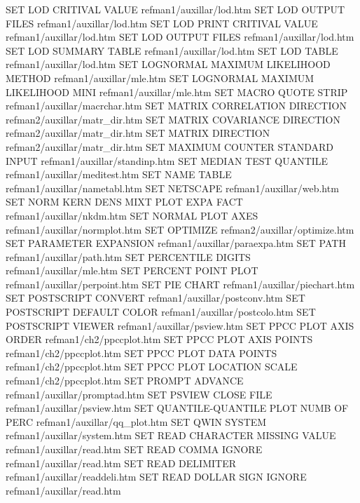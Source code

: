 SET LOD CRITIVAL VALUE                  refman1/auxillar/lod.htm
SET LOD OUTPUT FILES                    refman1/auxillar/lod.htm
SET LOD PRINT CRITIVAL VALUE            refman1/auxillar/lod.htm
SET LOD OUTPUT FILES                    refman1/auxillar/lod.htm
SET LOD SUMMARY TABLE                   refman1/auxillar/lod.htm
SET LOD TABLE                           refman1/auxillar/lod.htm
SET LOGNORMAL MAXIMUM LIKELIHOOD METHOD refman1/auxillar/mle.htm
SET LOGNORMAL MAXIMUM LIKELIHOOD MINI   refman1/auxillar/mle.htm
SET MACRO QUOTE STRIP                   refman1/auxillar/macrchar.htm
SET MATRIX CORRELATION DIRECTION        refman2/auxillar/matr_dir.htm
SET MATRIX COVARIANCE DIRECTION         refman2/auxillar/matr_dir.htm
SET MATRIX DIRECTION                    refman2/auxillar/matr_dir.htm
SET MAXIMUM COUNTER STANDARD INPUT      refman1/auxillar/standinp.htm
SET MEDIAN TEST QUANTILE                refman1/auxillar/meditest.htm
SET NAME TABLE                          refman1/auxillar/nametabl.htm
SET NETSCAPE                            refman1/auxillar/web.htm
SET NORM KERN DENS MIXT PLOT EXPA FACT  refman1/auxillar/nkdm.htm
SET NORMAL PLOT AXES                    refman1/auxillar/normplot.htm
SET OPTIMIZE                            refman2/auxillar/optimize.htm
SET PARAMETER EXPANSION                 refman1/auxillar/paraexpa.htm
SET PATH                                refman1/auxillar/path.htm
SET PERCENTILE DIGITS                   refman1/auxillar/mle.htm
SET PERCENT POINT PLOT                  refman1/auxillar/perpoint.htm
SET PIE CHART                           refman1/auxillar/piechart.htm
SET POSTSCRIPT CONVERT                  refman1/auxillar/postconv.htm
SET POSTSCRIPT DEFAULT COLOR            refman1/auxillar/postcolo.htm
SET POSTSCRIPT VIEWER                   refman1/auxillar/psview.htm
SET PPCC PLOT AXIS ORDER                refman1/ch2/ppccplot.htm
SET PPCC PLOT AXIS POINTS               refman1/ch2/ppccplot.htm
SET PPCC PLOT DATA POINTS               refman1/ch2/ppccplot.htm
SET PPCC PLOT LOCATION SCALE            refman1/ch2/ppccplot.htm
SET PROMPT ADVANCE                      refman1/auxillar/promptad.htm
SET PSVIEW CLOSE FILE                   refman1/auxillar/psview.htm
SET QUANTILE-QUANTILE PLOT NUMB OF PERC refman1/auxillar/qq_plot.htm
SET QWIN SYSTEM                         refman1/auxillar/system.htm
SET READ CHARACTER MISSING VALUE        refman1/auxillar/read.htm
SET READ COMMA IGNORE                   refman1/auxillar/read.htm
SET READ DELIMITER                      refman1/auxillar/readdeli.htm
SET READ DOLLAR SIGN IGNORE             refman1/auxillar/read.htm

